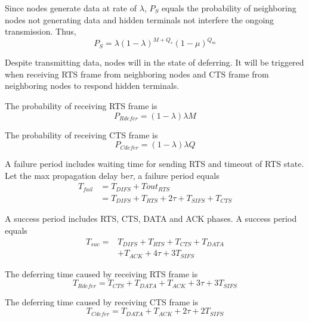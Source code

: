 \documentclass[conference]{IEEEtran}
\begin{document}
Since nodes generate data at rate of $\lambda$, $P_S$ equals the probability of neighboring nodes not generating data and hidden terminals not interfere the ongoing transmission. Thus,
\begin{equation}
P_S=\lambda(1-\lambda)^{M+Q_s}(1-\mu)^{Q_m}
\label{e1}
\end{equation}

Despite transmitting data, nodes will in the state of deferring. It will be triggered when receiving RTS frame from neighboring nodes and CTS frame from  neighboring nodes to respond hidden terminals.

The probability of receiving RTS frame is
\begin{equation}
P_{Rdefer}=(1-\lambda)\lambda M
\label{e2}
\end{equation}

The probability of receiving CTS frame is
\begin{equation}
P_{Cdefer}=(1-\lambda)\lambda Q
\label{e3}
\end{equation}

A failure period includes waiting time for sending RTS and timeout of RTS state. Let the max propagation delay be$\tau$, a failure period equals
\begin{equation}
\begin{aligned}
T_{fail}&=T_{DIFS}+Tout_{RTS}\\
&=T_{DIFS}+T_{RTS}+2\tau+T_{SIFS}+T_{CTS}
\end{aligned}
\label{e5}
\end{equation}

A success period includes RTS, CTS, DATA and ACK phases. A success period equals
\begin{equation}
\begin{aligned}
T_{suc}=&T_{DIFS}+T_{RTS}+T_{CTS}+T_{DATA}\\
&+T_{ACK}+4\tau+3T_{SIFS}
\end{aligned}
\label{e6}
\end{equation}

The deferring time caused by receiving RTS frame is
\begin{equation}
T_{Rdefer}=T_{CTS}+T_{DATA}+T_{ACK}+3\tau+3T_{SIFS}
\label{e7}
\end{equation}

The deferring time caused by receiving CTS frame is
\begin{equation}
T_{Cdefer}=T_{DATA}+T_{ACK}+2\tau+2T_{SIFS}
\label{e8}
\end{equation}
\end{document}
